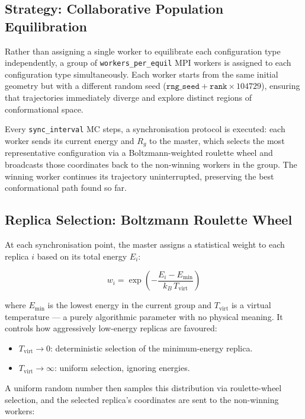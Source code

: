 \documentclass[11pt, a4paper]{article}
\begin{document}
\subsection{Strategy: Collaborative Population Equilibration}

Rather than assigning a single worker to equilibrate each configuration type
independently, a group of \texttt{workers\_per\_equil} MPI workers is assigned
to each configuration type simultaneously. Each worker starts from the same
initial geometry but with a different random seed
($\texttt{rng\_seed} + \texttt{rank} \times 104729$), ensuring that trajectories
immediately diverge and explore distinct regions of conformational space.

Every \texttt{sync\_interval} MC steps, a synchronisation protocol is executed:
each worker sends its current energy and $R_g$ to the master, which selects the
most representative configuration via a Boltzmann-weighted roulette wheel and
broadcasts those coordinates back to the non-winning workers in the group. The
winning worker continues its trajectory uninterrupted, preserving the best
conformational path found so far.

\subsection{Replica Selection: Boltzmann Roulette Wheel}

At each synchronisation point, the master assigns a statistical weight to each
replica $i$ based on its total energy $E_i$:

\begin{equation}
  w_i = \exp\!\left(-\frac{E_i - E_{\min}}{k_B \, T_{\text{virt}}}\right)
  \label{eq:boltzmann_weight}
\end{equation}

where $E_{\min}$ is the lowest energy in the current group and $T_{\text{virt}}$
is a virtual temperature — a purely algorithmic parameter with no
physical meaning. It controls how aggressively low-energy replicas are favoured:

\begin{itemize}
  \item $T_{\text{virt}} \to 0$: deterministic selection of the minimum-energy replica.
  \item $T_{\text{virt}} \to \infty$: uniform selection, ignoring energies.
\end{itemize}

A uniform random number then samples this distribution via roulette-wheel
selection, and the selected replica's coordinates are sent to the non-winning
workers:
\end{document}
